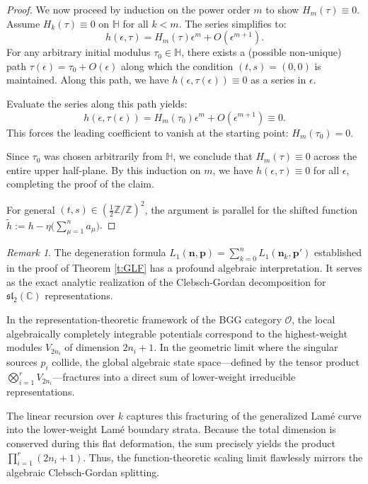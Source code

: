 \documentclass[11pt]{amsart}
\theoremstyle{remark}
\newtheorem{remark}[theorem]{Remark}
\numberwithin{equation}{section}
\begin{document}
\begin{proof}
We now proceed by induction on the power order $m$ to show $H_m(\tau) \equiv 0$. Assume $H_k(\tau) \equiv 0$ on $\mathbb{H}$ for all $k < m$. The series simplifies to:
\[
    h(\epsilon, \tau) = H_m(\tau)\epsilon^m + O(\epsilon^{m+1}).
\]
For any arbitrary initial modulus $\tau_0 \in \mathbb{H}$, there exists a (possible non-unique) path $\tau(\epsilon) = \tau_0 + O(\epsilon)$ along which the condition $(t,s) = (0,0)$ is maintained. Along this path, we have $h(\epsilon, \tau(\epsilon)) \equiv 0$ as a series in $\epsilon$.

Evaluate the series along this path yields:
\[
    h(\epsilon, \tau(\epsilon)) = H_m(\tau_0)\epsilon^m + O(\epsilon^{m+1}) \equiv 0.
\]
This forces the leading coefficient to vanish at the starting point: $H_m(\tau_0) = 0$.

Since $\tau_0$ was chosen arbitrarily from $\mathbb{H}$, we conclude that $H_m(\tau) \equiv 0$ across the entire upper half-plane. By this induction on $m$, we have $h(\epsilon, \tau) \equiv 0$ for all $\epsilon$, completing the proof of the claim.

For general $(t,s) \in (\tfrac{1}{2} \mathbb{Z} / \mathbb{Z})^2$, the argument is parallel for the shifted function $\tilde{h} := h - \eta \big( \sum_{\mu=1}^n a_\mu \big)$.
\end{proof}

\begin{remark} \label{rmk:representation_cg}
The degeneration formula $ L_1(\mathbf{n},\mathbf{p}) = \sum_{k=0}^n L_1(\mathbf{n}_k,\mathbf{p}')$ established in the proof of Theorem \ref{t:GLF} has a profound algebraic interpretation. It serves as the exact analytic realization of the Clebsch-Gordan decomposition for $\mathfrak{sl}_2(\mathbb{C})$ representations. 

In the representation-theoretic framework of the BGG category $\mathcal{O}$, the local algebraically completely integrable potentials correspond to the highest-weight modules $V_{2n_i}$ of dimension $2n_i + 1$. In the geometric limit where the singular sources $p_i$ collide, the global algebraic state space—defined by the tensor product $\bigotimes_{i=1}^r V_{2n_i}$—fractures into a direct sum of lower-weight irreducible representations. 

The linear recursion over $k$ captures this fracturing of the generalized Lam\'e curve into the lower-weight Lam\'e boundary strata. Because the total dimension is conserved during this flat deformation, the sum precisely yields the product $\prod_{i=1}^r (2n_i + 1)$. Thus, the function-theoretic scaling limit flawlessly mirrors the algebraic Clebsch-Gordan splitting.
\end{remark}
\end{document}
